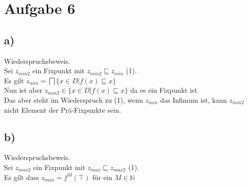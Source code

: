 \section*{Aufgabe 6}

\subsection*{a)}
Wiederspruchsbeweis.\\
Sei $z_{min2}$ ein Fixpunkt mit $z_{min2} \sqsubseteq z_{min}$ (1).\\
Es gilt $z_{min} = \bigsqcap \{x \in D | f(x) \sqsubseteq x \}$\\
Nun ist aber $z_{min2} \in \{x \in D | f(x) \sqsubseteq x \}$ da es ein Fixpunkt ist.\\
Das aber steht im Wiederspruch zu (1), wenn $z_{min}$ das Infimum ist, kann $z_{min2}$ nicht Element der Prä-Fixpunkte sein.

\subsection*{b)}
Wiederspruchsbeweis.\\
Sei $z_{max2}$ ein Fixpunkt mit $z_{max} \sqsubseteq z_{max2}$ (1).\\
Es gilt dass $z_{max} = f^M(\top)$ für ein $M \in \mathbb{N}$



